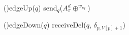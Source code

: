 
\SetInd{0.2em}{1em}

\small

\DontPrintSemicolon
\LinesNumbered

\Function(){\textup{edgeUp($q$)}}  {
     {
         send$_q$($A_{\pi}^{d} \oplus ^{w_{pq}}$)
    }
}


\Function(){\textup{edgeDown($q$)}} {
   {
       receiveDel($q$, $\delta_{p, V[p]+1}$)
  }
}


